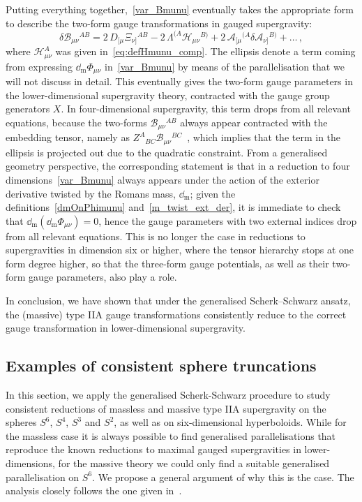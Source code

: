\documentclass[debug]{phd}
\begin{document}
					Putting everything together,~\eqref{var_Bmunu} eventually takes the appropriate form to describe the two-form gauge transformations in gauged supergravity:
							\begin{equation}
								\delta \mathcal{B}_{\mu\nu}{}^{AB} = 2 \,D_{[\mu} \Xi_{\nu]}{}^{AB} - 2\, \Lambda^{(A} \mathcal{H}_{\mu\nu}{}^{B)} + 2\,\mathcal{A}_{[\mu}{}^{(A} \delta\mathcal{A}_{\nu]}{}^{B)} + \ldots\,,
							\end{equation}
					where $\mathcal{H}_{\mu\nu}^{A}$ was given in~\eqref{eq:defHmunu_comp}. 
					The ellipsis denote a term coming from expressing $\dd_{\mathrm{m}}\Phi_{\mu\nu}$ in~\eqref{var_Bmunu} by means of the parallelisation that we will not discuss in detail. 
					This eventually gives the two-form gauge parameters in the lower-dimensional supergravity theory, contracted with the gauge group generators $X$. 
					In four-dimensional supergravity, this term drops from all relevant equations, because the two-forms $\mathcal{B}_{\mu\nu}{}^{AB}$ always appear contracted with the embedding tensor, namely as $Z^A{}_{BC}\mathcal{B}_{\mu\nu}{}^{BC}$~\cite{deWit:2007kvg}, which implies that the term in the ellipsis is projected out due to the quadratic constraint. 
					From a generalised geometry perspective, the corresponding statement is that in a reduction to four dimensions~\eqref{var_Bmunu} always appears under the action of the exterior derivative twisted by the Romans mass, $\dd_{\mathrm{m}}$; given the definitions~\eqref{dmOnPhimunu} and~\eqref{m_twist_ext_der}, it is immediate to check that $\dd_{\mathrm{m}}(\dd_{\mathrm{m}}\Phi_{\mu\nu})=0$, hence the gauge parameters with two external indices drop from all relevant equations. 
					This is no longer the case in reductions to supergravities in dimension six or higher, where the tensor hierarchy stops at one form degree higher, so that the three-form gauge potentials, as well as their two-form gauge parameters, also play a role. 

					In conclusion, we have shown that under the generalised Scherk--Schwarz ansatz, the (massive) type IIA gauge transformations consistently reduce to the correct gauge transformation in lower-dimensional supergravity.	
			\subsection{Examples of consistent sphere truncations}\label{sec:examples}
					In this section, we apply the generalised Scherk-Schwarz procedure to study consistent reductions of massless and massive type IIA supergravity on the spheres $S^6$, $S^4$, $S^3$ and $S^2$, as well as on six-dimensional hyperboloids. 
					While for the massless case it is always possible to find generalised parallelisations that reproduce the known reductions to maximal gauged supergravities in lower-dimensions, for the massive theory we could only find a suitable generalised parallelisation on $S^6$. 
					We propose a general argument of why this is the case.
					The analysis closely follows the one given in~\cite{oscar1}.
					
\end{document}
